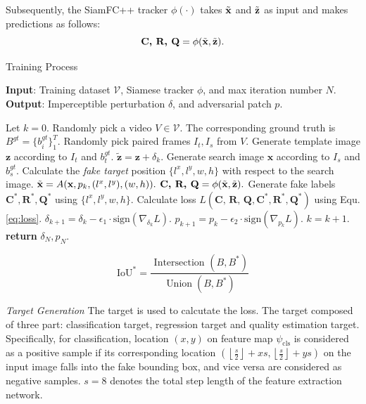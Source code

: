 \documentclass[journal]{IEEEtran}
\begin{document}
Subsequently, the SiamFC++ tracker $\phi(\cdot)$ takes $\tilde {\textbf x}$ and $\tilde{\textbf  z}$ as input and makes predictions as follows:
\begin{equation}
\textbf{C, R, Q} = \phi(\tilde {\textbf x}, \tilde{\textbf z}).
\end{equation}

\begin{algorithm}[tb]
  \caption{Training Process}
  \label{alg:algorithm}
  \textbf{Input}: Training dataset $\mathcal{V}$, Siamese tracker $\phi$, and max iteration number $N$.\\
  \textbf{Output}: Imperceptible perturbation $\delta$, and adversarial patch $p$.
  \begin{algorithmic}[1] %
  \STATE Let $k = 0$.
  \STATE Randomly pick a video $V\in \mathcal{V}$. The corresponding ground truth is $B^{gt}=\{b^{gt}_i\}^T_1$.
  \STATE Randomly pick paired frames $I_t, I_s$ from $V$.
  \STATE Generate template image $\textbf{z}$ according to $I_t$ and $b^{gt}_t$.
  \STATE $\tilde{\textbf{z}} = \textbf{z} + \delta_k.$
  \STATE Generate search image $\textbf{x}$ according to $I_s$ and $b^{gt}_s$.
  \STATE Calculate the \textit{fake target} position $\{l^x, l^y, w, h\}$ with respect to the search image.
  \STATE $\tilde{\textbf x} = A(\textbf x, p_k, (l^x, l^y), (w, h)).$
  \STATE $\textbf{C, R, Q} = \phi(\tilde {\textbf x}, \tilde{\textbf z}).$
  \STATE Generate fake labels $\textbf{C}^*,\textbf{R}^*,\textbf{Q}^*$ using $\{l^x, l^y, w, h\}$.
  \STATE Calculate loss $L(\textbf{C, R, Q}, \textbf{C}^*, \textbf{R}^*, \textbf{Q}^*)$ using Equ. \ref{eq:loss}.
  \STATE $\delta_{k+1} = \delta_{k} - \epsilon_1 \cdot \text{sign}(\nabla_{\delta_k}L).$
  \STATE $p_{k+1} = p_{k} - \epsilon_2 \cdot \text{sign}(\nabla_{p_k}L).$
  \STATE $k = k + 1.$
  \ENDWHILE
  \STATE \textbf{return} $\delta_N, p_N.$
  \end{algorithmic}
  \label{alg}
\end{algorithm}

\begin{equation}
  \mathrm{IoU}^{*}=\frac{\text { Intersection }\left(B, B^{*}\right)}{\operatorname{Union}\left(B, B^{*}\right)}
\end{equation}

\textit{Target Generation} The target is used to calcutate the loss. The target composed of three part: classification target, regression target and quality estimation target. Specifically, for classification, location $(x,y)$ on feature map $\psi_{\mathrm{cls}}$ is considered as a positive sample if its corresponding location $\left(\left\lfloor\frac{s}{2}\right\rfloor+x s,\left\lfloor\frac{s}{2}\right\rfloor+y s\right)$ on the input image falls into the fake bounding box, and vice versa are considered as negative samples. $s=8$ denotes the total step length of the feature extraction network.
\end{document}
